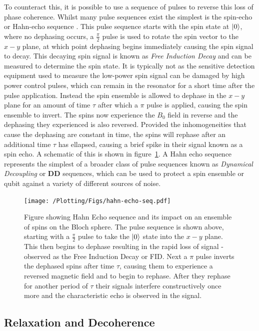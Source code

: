 To counteract this, it is possible to use a sequence of pulses to reverse this loss of phase coherence. Whilst many pulse sequences exist the simplest is the spin-echo or Hahn-echo sequence \cite{Schweiger,hahn1950}. This pulse sequence starts with the spin state at $\ket{0}$, where no dephasing occurs, a $\frac{\pi}{2}$ pulse is used to rotate the spin vector to the $x-y$ plane, at which point dephasing begins immediately causing the spin signal to decay. This decaying spin signal is known as \emph{Free Induction Decay} and can be measured to determine the spin state. It is typically not as the sensitive detection equipment used to measure the low-power spin signal can be damaged by high power control pulses, which can remain in the resonator for a short time after the pulse application. Instead the spin ensemble is allowed to dephase in the $x-y$ plane for an amount of time $\tau$ after which a $\pi$ pulse is applied, causing the spin ensemble to invert. The spins now experience the $B_0$ field in reverse and the dephasing they experienced is also reversed. Provided the inhomogeneities that cause the dephasing are constant in time, the spins will rephase after an additional time $\tau$ has ellapsed, causing a brief spike in their signal known as a spin echo. A schematic of this is shown in figure~\ref{fig:hahnechoseq}. A Hahn echo sequence represents the simplest of a broader class of pulse sequences known as \emph{Dynamical Decoupling} or \textbf{DD} sequences, which can be used to protect a spin ensemble or qubit against a variety of different sources of noise.

\begin{figure}
  \texttt{[image: /Plotting/Figs/hahn-echo-seq.pdf]}
  \caption[Hahn echo sequence and bloch sphere]{Figure showing Hahn Echo sequence and its impact on an ensemble of spins on the Bloch sphere. The pulse sequence is shown above, starting with a $\frac{\pi}{2}$ pulse to take the $\ket{0}$ state into the $x-y$ plane. This then begins to dephase resulting in the rapid loss of signal - observed as the Free Induction Decay or FID. Next a $\pi$ pulse inverts the dephased spins after time $\tau$, causing them to experience a reversed magnetic field and to begin to rephase. After they rephase for another period of $\tau$ their signals interfere constructively once more and the characteristic echo is observed in the signal.}
  \label{fig:hahnechoseq}
\end{figure}

\subsection{Relaxation and Decoherence}

